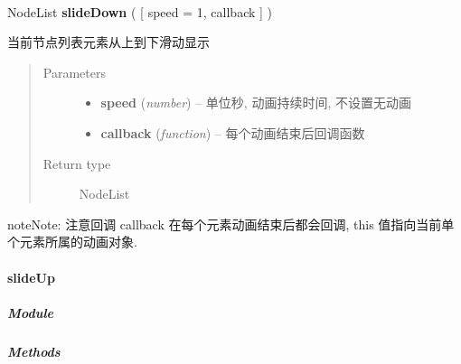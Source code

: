 \documentclass[letterpaper,10pt,english]{sphinxmanual}
\begin{document}
\begin{fulllineitems}
\label{api/core/node/slideDown:Node.slideDown}~
\begin{DUlineblock}{0em}
\item[] NodeList \textbf{slideDown} ( {[} speed = 1, callback {]} )
\item[] 当前节点列表元素从上到下滑动显示
\end{DUlineblock}
\begin{quote}\begin{description}
\item[{Parameters}] \leavevmode\begin{itemize}
\item {}
\textbf{speed} (\emph{number}) -- 单位秒, 动画持续时间, 不设置无动画

\item {}
\textbf{callback} (\emph{function}) -- 每个动画结束后回调函数

\end{itemize}

\item[{Return type}] \leavevmode
NodeList

\end{description}\end{quote}

\begin{notice}{note}{Note:}
注意回调 callback 在每个元素动画结束后都会回调,  this 值指向当前单个元素所属的动画对象.
\end{notice}

\end{fulllineitems}



\paragraph{slideUp}
\label{api/core/node/slideUp::doc}\label{api/core/node/slideUp:slideup}

\subparagraph{Module}
\label{api/core/node/slideUp:module}\begin{quote}

{\hyperref[api/core/node/index:module-Node]{}}
\end{quote}


\subparagraph{Methods}
\label{api/core/node/slideUp:methods}
\end{document}
